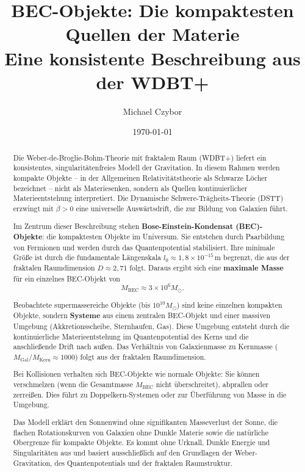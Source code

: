 \documentclass[12pt,a4paper]{article}
\title{BEC-Objekte: Die kompaktesten Quellen der Materie\\ 
\large{Eine konsistente Beschreibung aus der WDBT+}}
\author{Michael Czybor}
\date{\today}
\begin{document}
\maketitle

\begin{abstract}
Die Weber-de-Broglie-Bohm-Theorie mit fraktalem Raum (WDBT+) liefert ein konsistentes, singularitätenfreies Modell der Gravitation. In diesem Rahmen werden kompakte Objekte – in der Allgemeinen Relativitätstheorie als Schwarze Löcher bezeichnet – nicht als Materiesenken, sondern als Quellen kontinuierlicher Materieentstehung interpretiert. Die Dynamische Schwere-Trägheits-Theorie (DSTT) erzwingt mit $\dot{\beta}>0$ eine universelle Auswärtsdrift, die zur Bildung von Galaxien führt.

Im Zentrum dieser Beschreibung stehen \textbf{Bose-Einstein-Kondensat (BEC)-Objekte}: die kompaktesten Objekte im Universum. Sie entstehen durch Paarbildung von Fermionen und werden durch das Quantenpotential stabilisiert. Ihre minimale Größe ist durch die fundamentale Längenskala $l_0 \approx 1{,}8 \times 10^{-15}\,\text{m}$ begrenzt, die aus der fraktalen Raumdimension $D \approx 2{,}71$ folgt. Daraus ergibt sich eine \textbf{maximale Masse} für ein einzelnes BEC-Objekt von 
\[
M_{\text{BEC}} \approx 3 \times 10^6 M_\odot.
\]

Beobachtete supermassereiche Objekte (bis $10^{10} M_\odot$) sind keine einzelnen kompakten Objekte, sondern \textbf{Systeme} aus einem zentralen BEC-Objekt und einer massiven Umgebung (Akkretionsscheibe, Sternhaufen, Gas). Diese Umgebung entsteht durch die kontinuierliche Materieentstehung im Quantenpotential des Kerns und die anschließende Drift nach außen. Das Verhältnis von Galaxienmasse zu Kernmasse ($M_{\text{Gal}}/M_{\text{Kern}} \approx 1000$) folgt aus der fraktalen Raumdimension.

Bei Kollisionen verhalten sich BEC-Objekte wie normale Objekte: Sie können verschmelzen (wenn die Gesamtmasse $M_{\text{BEC}}$ nicht überschreitet), abprallen oder zerreißen. Dies führt zu Doppelkern-Systemen oder zur Überführung von Masse in die Umgebung.

Das Modell erklärt den Sonnenwind ohne signifikanten Masseverlust der Sonne, die flachen Rotationskurven von Galaxien ohne Dunkle Materie sowie die natürliche Obergrenze für kompakte Objekte. Es kommt ohne Urknall, Dunkle Energie und Singularitäten aus und basiert ausschließlich auf den Grundlagen der Weber-Gravitation, des Quantenpotentials und der fraktalen Raumstruktur.
\end{abstract}
\end{document}
